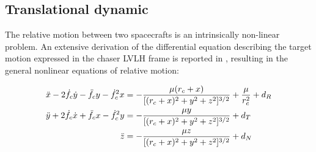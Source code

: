 \subsection{Translational dynamic}
The relative motion between two spacecrafts is an intrinsically non-linear problem. An extensive derivation of the differential equation describing the target motion expressed in the chaser LVLH frame is reported in \cite{alfriend2009spacecraft}, resulting in the general nonlinear equations of relative motion:

\begin{equation}
\label{eq:alfr}
\begin{split}
    \Ddot{x}-2\dot{f}_c \dot{y} - \Ddot{f}_c y - \dot{f}_c^2 x &= - \dfrac{\mu (r_c + x)}{[(r_c + x)^2 + y^2 + z^2]^{3/2}} + \dfrac{\mu}{r_c^2} +  d_R\\
    \Ddot{y}+2\dot{f}_c\dot{x}+\Ddot{f}_c x - \dot{f}_c^2 y &= - \dfrac{\mu y}{[(r_c + x)^2 + y^2 + z^2]^{3/2}} + d_T\\
    \Ddot{z}& = - \dfrac{\mu z}{[(r_c + x)^2 + y^2 + z^2]^{3/2}} + d_N\\
    \end{split}
\end{equation}

